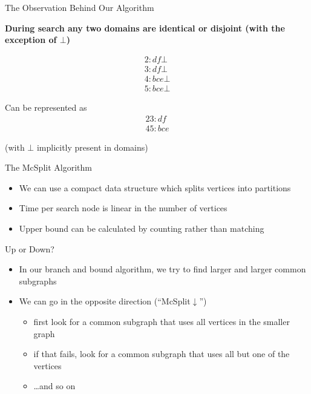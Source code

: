 \documentclass{beamer}
\begin{document}
\begin{frame}{The Observation Behind Our Algorithm}

  \textbf{During search any two domains are identical or disjoint (with the exception of $\bot$)}

  \begin{gather*}
    2: d f \bot \\
    3: d f \bot \\
    4: b c e \bot \\
    5: b c e \bot
  \end{gather*}

  Can be represented as 
  \begin{gather*}
    2 3 : d f \\
    4 5 : b c e
  \end{gather*}

  (with $\bot$ implicitly present in domains)
\end{frame}

\begin{frame}{The McSplit Algorithm}
    \begin{itemize}
        \item We can use a compact data structure which splits vertices into
            partitions
        \item Time per search node is linear in the number of vertices
        \item Upper bound can be calculated by counting rather than matching
    \end{itemize}
\end{frame}

\begin{frame}{Up or Down?}
    \begin{itemize}
        \item In our branch and bound algorithm, we try to find larger and larger common subgraphs
        \item We can go in the opposite direction (``McSplit$\downarrow$'')
          \begin{itemize}
            \item first look for a common subgraph that uses all vertices in the smaller graph
            \item if that fails, look for a common subgraph that uses all but one of the vertices
            \item \dots and so on
          \end{itemize}
    \end{itemize}
\end{frame}
\end{document}
